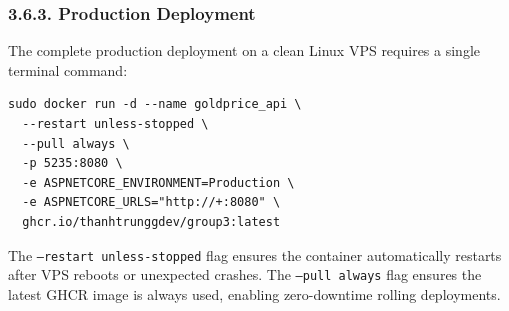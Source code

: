 \subsubsection{3.6.3. Production Deployment}
The complete production deployment on a clean Linux VPS requires a single terminal command:

\begin{lstlisting}[language={}, numbers=none]
sudo docker run -d --name goldprice_api \
  --restart unless-stopped \
  --pull always \
  -p 5235:8080 \
  -e ASPNETCORE_ENVIRONMENT=Production \
  -e ASPNETCORE_URLS="http://+:8080" \
  ghcr.io/thanhtrunggdev/group3:latest
\end{lstlisting}

The \texttt{--restart unless-stopped} flag ensures the container automatically restarts after VPS reboots or unexpected crashes. The \texttt{--pull always} flag ensures the latest GHCR image is always used, enabling zero-downtime rolling deployments.

\newpage
